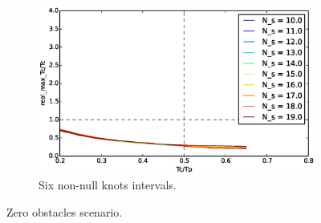 \begin{figure}
        ~ %
        \begin{subfigure}[b]{0.48\textwidth}
                \includegraphics[width=\textwidth]{./img/realtime/Scenario_0__N_knots_6/uni.eps}
                \caption{Six non-null knots intervals.}\label{fig:uni06}
        \end{subfigure}%
        \caption{Zero obstacles scenario.}\label{fig:uni0}
\end{figure}
